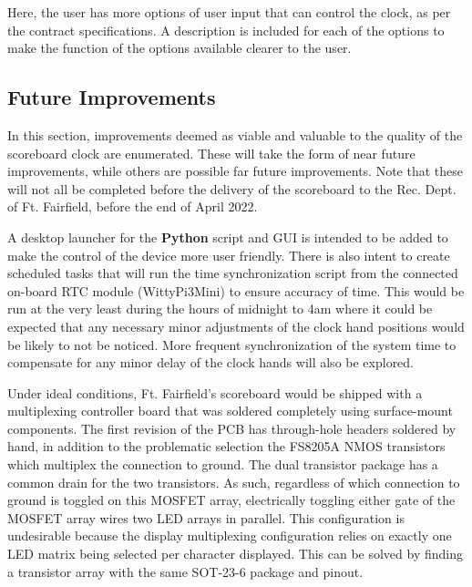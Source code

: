 \documentclass[11pt]{article}
\begin{document}

Here, the user has more options of user input that can control the clock, as per the contract specifications. A description is included for each of the options to make the function of the options available clearer to the user.


\subsection{Future Improvements}
\label{future}

In this section, improvements deemed as viable and valuable to the quality of the scoreboard clock are enumerated. These will take the form of near future improvements, while others are possible far future improvements. Note that these will not all be completed before the delivery of the scoreboard to the Rec. Dept. of Ft. Fairfield, before the end of April 2022.

A desktop launcher for the \textbf{Python} script and GUI is intended to be added to make the control of the device more user friendly. There is also intent to create scheduled tasks that will run the time synchronization script from the connected on-board RTC module (WittyPi3Mini) to ensure accuracy of time. This would be run at the very least during the hours of midnight to 4am where it could be expected that any necessary minor adjustments of the clock hand positions would be likely to not be noticed. More frequent synchronization of the system time to compensate for any minor delay of the clock hands will also be explored. 

Under ideal conditions, Ft. Fairfield's scoreboard would be shipped with a multiplexing controller board that was soldered completely using surface-mount components. The first revision of the PCB has through-hole headers soldered by hand, in addition to the problematic selection the FS8205A NMOS transistors which multiplex the connection to ground. The dual transistor package has a common drain for the two transistors. As such, regardless of which connection to ground is toggled on this MOSFET array, electrically toggling either gate of the MOSFET array wires two LED arrays in parallel. This configuration is undesirable because the display multiplexing configuration relies on exactly one LED matrix being selected per character displayed. This can be solved by finding a transistor array with the same SOT-23-6 package and pinout.
\end{document}
